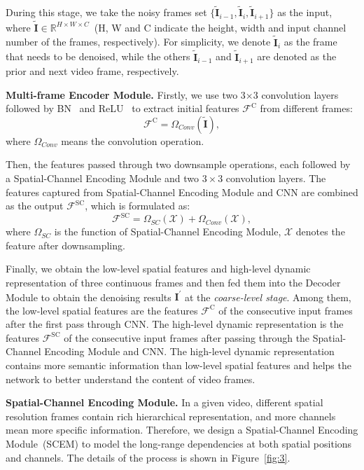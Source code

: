 \documentclass[journal]{IEEEtran}
\begin{document}
During this stage, we take the noisy frames set $\{ \tilde{\mathbf{I}}_{i-1}, {\tilde{\mathbf{I}}}_{i},{\tilde{\mathbf{I}}}_{i+1}\}$ as the input, where $\tilde{\mathbf{I}}\in \mathbb{R}^{H \times W \times C}$~(${\mathrm{H}}$, W and C indicate the height, width and input channel number of the frames, respectively). For simplicity, we denote $\tilde{\mathbf{I}}_i$ as the frame that needs to be denoised, while the others $\tilde{\mathbf{I}}_{i-1}$ and $\tilde{\mathbf{I}}_{i+1}$ are denoted as the prior and next video frame, respectively. 

\noindent
\textbf{Multi-frame Encoder Module.}  
Firstly, we use two 3×3 convolution layers followed by BN~\cite{ioffe2015batch} and ReLU~\cite{glorot2011deep} to extract initial features $\mathcal{F}^{\text {C}}$ from different frames:
\begin{equation}
\mathcal{F}^{\text {C}} =\Omega_{Conv}(\tilde{\mathbf{I}}),
\end{equation}
where $\Omega_{Conv}$ means the convolution operation. 

Then, the features passed through two downsample operations, each followed by a Spatial-Channel Encoding Module and two $3\times3$ convolution layers. The features captured from Spatial-Channel Encoding Module and CNN are combined as the output $\mathcal{F}^{\text {SC}}$, which is formulated as:  
\begin{equation}
\mathcal{F}^{\text {SC}}=\Omega_{SC}(\mathcal{X})+\Omega_{Conv}(\mathcal{X}),
\end{equation}
where $\Omega_{SC}$ is the function of Spatial-Channel Encoding Module, $\mathcal{X}$ denotes the feature after downsampling. 

Finally, we obtain the low-level spatial features and high-level dynamic representation of three continuous frames and then fed them into the Decoder Module to obtain the denoising results $\mathbf{I}^{\prime}$ at the \emph{coarse-level stage}.
Among them, the low-level spatial features are the features $\mathcal{F}^{\text {C}}$ of the consecutive input frames after the first pass through CNN. The high-level dynamic representation is the features $\mathcal{F}^{\text {SC}}$ of the consecutive input frames after passing through the Spatial-Channel Encoding Module and CNN. The high-level dynamic representation contains more semantic information than low-level spatial features and helps the network to better understand the content of video frames. 


\noindent
\textbf{Spatial-Channel Encoding Module.} In a given video, different spatial resolution frames contain rich hierarchical representation, and more channels mean more specific information. Therefore, we design a Spatial-Channel Encoding Module~(SCEM) to model the long-range dependencies at both spatial positions and channels. The details of the process is shown in Figure~\ref{fig:3}.
\end{document}
